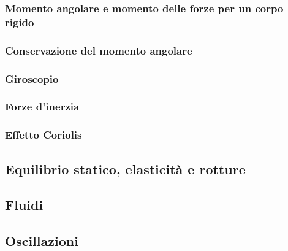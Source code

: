 \documentclass[a4paper,12pt]{article}
\theoremstyle{mystyle}
\begin{document}
\subsubsection{Momento angolare e momento delle forze per un corpo rigido}
\subsubsection{Conservazione del momento angolare}
\subsubsection{Giroscopio}
\subsubsection{Forze d'inerzia}
\subsubsection{Effetto Coriolis}

\newpage


\subsection{Equilibrio statico, elasticità e rotture}

\newpage


\subsection{Fluidi}

\newpage


\subsection{Oscillazioni}
\end{document}
